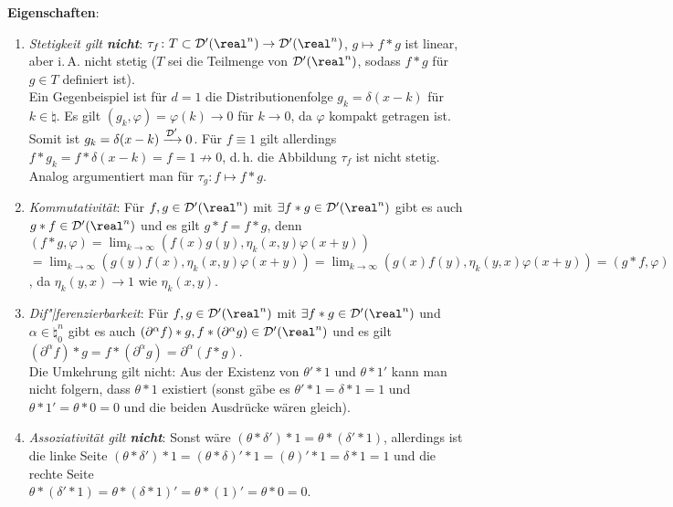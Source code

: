 \textbf{Eigenschaften}:
\begin{enumerate}
    \item
    \emph{Stetigkeit gilt \textbf{nicht}}:
    $\tau_f\colon T \subset \D'(\real^n) \rightarrow \D'(\real^n)$,
    $g \mapsto f \ast g$ ist linear,
    aber i.\,A. nicht stetig ($T$ sei die Teilmenge von $\D'(\real^n)$,
    sodass $f \ast g$ für $g \in T$ definiert ist).\\
    Ein Gegenbeispiel ist für $d = 1$ die Distributionenfolge
    $g_k = \delta(x - k)$ für $k \in \natural$.
    Es gilt $(g_k, \varphi) = \varphi(k) \to 0$ für $k \to 0$,
    da $\varphi$ kompakt getragen ist.
    Somit ist $g_k = \delta(x - k) \xrightarrow{\mathcal{D}'} 0$.
    Für $f \equiv 1$ gilt allerdings
    $f \ast g_k = f \ast \delta(x - k) = f = 1 \not\to 0$,
    d.\,h. die Abbildung $\tau_f$ ist nicht stetig.
    Analog argumentiert man für $\tau_g\colon f \mapsto f \ast g$.

    \item
    \emph{Kommutativität}:
    Für $f, g \in \D'(\real^n)$ mit $\exists f \ast g \in \D'(\real^n)$
    gibt es auch $g \ast f \in \D'(\real^n)$ und es gilt
    $g \ast f = f \ast g$, denn
    $(f \ast g, \varphi) =
    \lim_{k \to \infty} (f(x)g(y), \eta_k(x, y)\varphi(x + y))$\\
    $= \lim_{k \to \infty} (g(y)f(x), \eta_k(x, y)\varphi(x + y)) =
    \lim_{k \to \infty} (g(x)f(y), \eta_k(y, x)\varphi(x + y)) =
    (g \ast f, \varphi)$,
    da $\eta_k(y, x) \to 1$ wie $\eta_k(x, y)$.

    \item
    \emph{Dif"|ferenzierbarkeit}:
    Für $f, g \in \D'(\real^n)$ mit $\exists f \ast g \in \D'(\real^n)$
    und $\alpha \in \natural_0^n$
    gibt es auch $(\partial^\alpha f) \ast g,
    f \ast (\partial^\alpha g) \in \D'(\real^n)$ und es gilt
    $(\partial^\alpha f) \ast g = f \ast (\partial^\alpha g) =
    \partial^\alpha (f \ast g)$.\\
    Die Umkehrung gilt nicht:
    Aus der Existenz von $\theta' \ast 1$ und $\theta \ast 1'$
    kann man nicht folgern, dass $\theta \ast 1$ existiert
    (sonst gäbe es $\theta' \ast 1 = \delta \ast 1 = 1$ und
    $\theta \ast 1' = \theta \ast 0 = 0$ und
    die beiden Ausdrücke wären gleich).

    \item
    \emph{Assoziativität gilt \textbf{nicht}}:
    Sonst wäre $(\theta \ast \delta') \ast 1 = \theta \ast (\delta' \ast 1)$,
    allerdings ist die linke Seite
    $(\theta \ast \delta') \ast 1 = (\theta \ast \delta)' \ast 1 =
    (\theta)' \ast 1 = \delta \ast 1 = 1$ und die rechte Seite\\
    $\theta \ast (\delta' \ast 1) = \theta \ast (\delta \ast 1)' =
    \theta \ast (1)' = \theta \ast 0 = 0$.


\end{enumerate}
